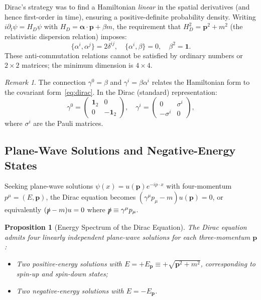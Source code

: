 \documentclass[12pt]{article}
\newtheorem{proposition}[theorem]{Proposition}
\theoremstyle{definition}
\theoremstyle{remark}
\newtheorem{remark}[theorem]{Remark}
\begin{document}
Dirac's strategy was to find a Hamiltonian \emph{linear} in the spatial derivatives
(and hence first-order in time), ensuring a positive-definite probability density.
Writing $i\partial_t \psi = H_D \psi$ with $H_D = \boldsymbol{\alpha} \cdot \mathbf{p} + \beta m$,
the requirement that $H_D^2 = \mathbf{p}^2 + m^2$ (the relativistic dispersion relation)
imposes:
\begin{equation}
\label{eq:dirac_algebra}
\{\alpha^i, \alpha^j\} = 2\delta^{ij}, \quad \{\alpha^i, \beta\} = 0, \quad \beta^2 = \mathbf{1}.
\end{equation}
These anti-commutation relations cannot be satisfied by ordinary numbers or $2 \times 2$
matrices; the minimum dimension is $4 \times 4$.

\begin{remark}
The connection $\gamma^0 = \beta$ and $\gamma^i = \beta \alpha^i$ relates the Hamiltonian
form to the covariant form~\eqref{eq:dirac}. In the Dirac (standard) representation:
\begin{equation}
\gamma^0 = \begin{pmatrix} \mathbf{1}_2 & 0 \\ 0 & -\mathbf{1}_2 \end{pmatrix}, \quad
\gamma^i = \begin{pmatrix} 0 & \sigma^i \\ -\sigma^i & 0 \end{pmatrix},
\end{equation}
where $\sigma^i$ are the Pauli matrices.
\end{remark}

\subsection{Plane-Wave Solutions and Negative-Energy States}

Seeking plane-wave solutions $\psi(x) = u(\mathbf{p}) e^{-ip \cdot x}$ with
four-momentum $p^\mu = (E, \mathbf{p})$, the Dirac equation becomes
$(\gamma^\mu p_\mu - m)u(\mathbf{p}) = 0$, or equivalently
$(\slashed{p} - m)u = 0$ where $\slashed{p} \equiv \gamma^\mu p_\mu$.

\begin{proposition}[Energy Spectrum of the Dirac Equation]
\label{prop:energy_spectrum}
The Dirac equation admits four linearly independent plane-wave solutions for each
three-momentum $\mathbf{p}$:
\begin{itemize}
    \item Two positive-energy solutions with $E = +E_{\mathbf{p}} \equiv +\sqrt{\mathbf{p}^2 + m^2}$,
    corresponding to spin-up and spin-down states;
    \item Two negative-energy solutions with $E = -E_{\mathbf{p}}$.
\end{itemize}
\end{proposition}
\end{document}
